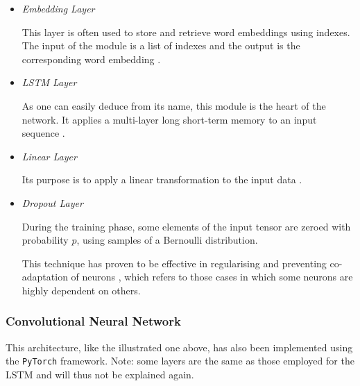 \documentclass[letterpaper,11pt]{article}
\begin{document}
\begin{itemize}
  \item \textit{Embedding Layer}
  
  \vspace{-0.6mm}
  
  This layer is often used to store and retrieve word embeddings using indexes. The input of the module is a list of indexes and the output is the corresponding word embedding \cite{pytorch_embedding}.
  \item \textit{LSTM Layer}
  
  \vspace{-0.6mm}

  As one can easily deduce from its name, this module is the heart of the network. It applies a multi-layer long short-term memory to an input sequence \cite{pytorch_lstm}.
  \item \textit{Linear Layer}
  
  \vspace{-0.6mm}
  
  Its purpose is to apply a linear transformation to the input data \cite{pytorch_linear}.
  \item \textit{Dropout Layer}
  
  During the training phase, some elements of the input tensor are zeroed with probability $p$, using samples of a Bernoulli distribution.

  This technique has proven to be effective in regularising and preventing co-adaptation of neurons \cite{pytorch_dropout}, which refers to those cases in which some neurons are highly dependent on others.
\end{itemize}



\subsubsection*{Convolutional Neural Network}

This architecture, like the illustrated one above, has also been implemented using the \verb|PyTorch| framework. Note: some layers are the same as those employed for the LSTM and will thus not be explained again.
\end{document}
